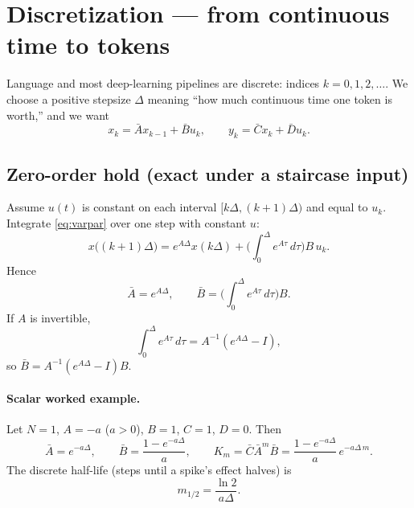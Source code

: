 \documentclass[11pt,a4paper]{article}
\begin{document}
\section{Discretization --- from continuous time to tokens}

Language and most deep-learning pipelines are discrete: indices $k=0,1,2,\ldots$.
We choose a positive stepsize $\Delta$ meaning ``how much continuous time one token is worth,'' and we want
\begin{equation}
x_k=\bar{A}x_{k-1}+\bar{B}u_k,\qquad
y_k=\bar{C}x_k+\bar{D}u_k.
\label{eq:disc}
\end{equation}

\subsection{Zero-order hold (exact under a staircase input)}

Assume $u(t)$ is constant on each interval $[k\Delta,(k+1)\Delta)$ and equal to $u_k$.
Integrate \eqref{eq:varpar} over one step with constant $u$:
\begin{equation}
x\big((k+1)\Delta\big)
=e^{A\Delta}x(k\Delta)
+\Big(\int_0^{\Delta}e^{A\tau}\,d\tau\Big)B\,u_k.
\end{equation}
Hence
\begin{equation}
\bar{A}=e^{A\Delta},\qquad
\bar{B}=\Big(\int_0^{\Delta}e^{A\tau}\,d\tau\Big)B.
\label{eq:zoh}
\end{equation}
If $A$ is invertible,
\begin{equation}
\int_0^{\Delta}e^{A\tau}\,d\tau=A^{-1}(e^{A\Delta}-I),
\end{equation}
so $\bar{B}=A^{-1}(e^{A\Delta}-I)B$.

\paragraph{Scalar worked example.}
Let $N=1$, $A=-a$ ($a>0$), $B=1$, $C=1$, $D=0$.
Then
\begin{equation}
\bar{A}=e^{-a\Delta},\qquad
\bar{B}=\frac{1-e^{-a\Delta}}{a},\qquad
K_m=\bar{C}\bar{A}^m\bar{B}=\frac{1-e^{-a\Delta}}{a}\,e^{-a\Delta\,m}.
\end{equation}
The discrete half-life (steps until a spike's effect halves) is
\begin{equation}
m_{1/2}=\frac{\ln 2}{a\Delta}.
\end{equation}
\end{document}
